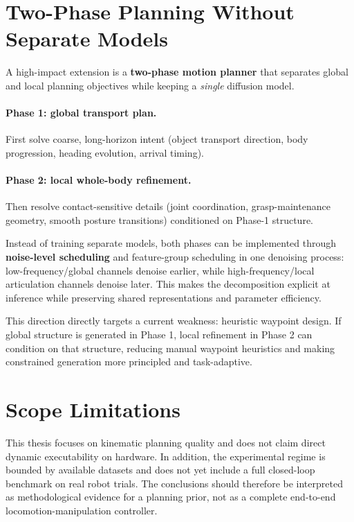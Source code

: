 \section{Two-Phase Planning Without Separate Models}

A high-impact extension is a \textbf{two-phase motion planner} that separates global and local planning objectives while keeping a \emph{single} diffusion model.

\paragraph{Phase 1: global transport plan.}
First solve coarse, long-horizon intent (object transport direction, body progression, heading evolution, arrival timing).

\paragraph{Phase 2: local whole-body refinement.}
Then resolve contact-sensitive details (joint coordination, grasp-maintenance geometry, smooth posture transitions) conditioned on Phase-1 structure.

Instead of training separate models, both phases can be implemented through \textbf{noise-level scheduling} and feature-group scheduling in one denoising process: low-frequency/global channels denoise earlier, while high-frequency/local articulation channels denoise later. This makes the decomposition explicit at inference while preserving shared representations and parameter efficiency.

This direction directly targets a current weakness: heuristic waypoint design. If global structure is generated in Phase 1, local refinement in Phase 2 can condition on that structure, reducing manual waypoint heuristics and making constrained generation more principled and task-adaptive.

\section{Scope Limitations}

This thesis focuses on kinematic planning quality and does not claim direct dynamic executability on hardware. In addition, the experimental regime is bounded by available datasets and does not yet include a full closed-loop benchmark on real robot trials. The conclusions should therefore be interpreted as methodological evidence for a planning prior, not as a complete end-to-end locomotion-manipulation controller.

